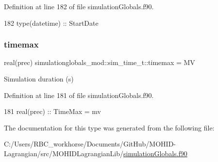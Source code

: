 Definition at line 182 of file simulation\+Globals.\+f90.


\begin{DoxyCode}
182         \textcolor{keywordtype}{type}(datetime)  :: StartDate
\end{DoxyCode}
\mbox{\label{structsimulationglobals__mod_1_1sim__time__t_ae84053cfbfb0b731cbf15e7334f223cd}} 
\subsubsection{\texorpdfstring{timemax}{timemax}}
{\footnotesize\ttfamily real(prec) simulationglobals\+\_\+mod\+::sim\+\_\+time\+\_\+t\+::timemax = MV\hspace{0.3cm}{\ttfamily [private]}}



Simulation duration (s) 



Definition at line 181 of file simulation\+Globals.\+f90.


\begin{DoxyCode}
181         \textcolor{keywordtype}{real(prec)}      :: TimeMax = mv              
\end{DoxyCode}


The documentation for this type was generated from the following file\+:\begin{DoxyCompactItemize}
\item 
C\+:/\+Users/\+R\+B\+C\+\_\+workhorse/\+Documents/\+Git\+Hub/\+M\+O\+H\+I\+D-\/\+Lagrangian/src/\+M\+O\+H\+I\+D\+Lagrangian\+Lib/\mbox{\hyperlink{simulation_globals_8f90}{simulation\+Globals.\+f90}}\end{DoxyCompactItemize}

